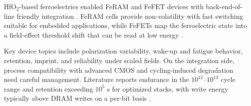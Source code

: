HfO$_2$-based ferroelectrics enabled FeRAM and FeFET devices with back-end-of-line friendly integration \cite{boscke2011,mueller2012}. FeRAM cells provide non-volatility with fast switching suitable for embedded applications, while FeFETs map the ferroelectric state into a field-effect threshold shift that can be read at low energy \cite{noheda2023}.

Key device topics include polarization variability, wake-up and fatigue behavior, retention, imprint, and reliability under scaled fields. On the integration side, process compatibility with advanced CMOS and cycling-induced degradation need careful management. Literature reports endurance in the $10^{12}$--$10^{13}$ cycle range and retention exceeding $10^5$ s for optimized stacks, with write energy typically above DRAM writes on a per-bit basis \cite{noheda2023,martin2020}.
